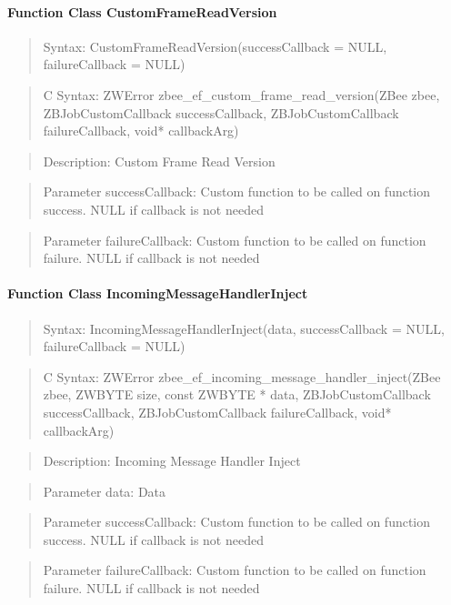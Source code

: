 \paragraph{Function Class CustomFrameReadVersion}
\begin{quote}Syntax: CustomFrameReadVersion(successCallback = NULL, failureCallback = NULL)\end{quote}
\begin{quote}C Syntax: ZWError zbee\_ef\_custom\_frame\_read\_version(ZBee zbee, ZBJobCustomCallback successCallback, ZBJobCustomCallback failureCallback, void* callbackArg)\end{quote}
\begin{quote}Description: Custom Frame Read Version\end{quote}
\begin{quote}Parameter successCallback: Custom function to be called on function success. NULL if callback is not needed\end{quote}
\begin{quote}Parameter failureCallback: Custom function to be called on function failure. NULL if callback is not needed\end{quote}


\paragraph{Function Class IncomingMessageHandlerInject}
\begin{quote}Syntax: IncomingMessageHandlerInject(data, successCallback = NULL, failureCallback = NULL)\end{quote}
\begin{quote}C Syntax: ZWError zbee\_ef\_incoming\_message\_handler\_inject(ZBee zbee, ZWBYTE size, const ZWBYTE * data, ZBJobCustomCallback successCallback, ZBJobCustomCallback failureCallback, void* callbackArg)\end{quote}
\begin{quote}Description: Incoming Message Handler Inject\end{quote}
\begin{quote}Parameter data: Data\end{quote}
\begin{quote}Parameter successCallback: Custom function to be called on function success. NULL if callback is not needed\end{quote}
\begin{quote}Parameter failureCallback: Custom function to be called on function failure. NULL if callback is not needed\end{quote}

